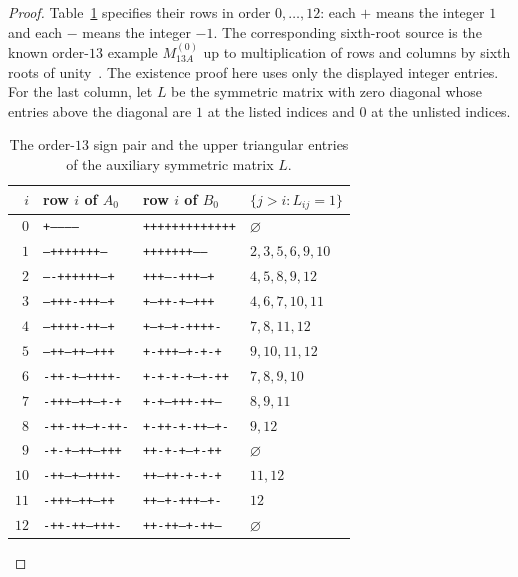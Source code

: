\documentclass[10pt]{article}
\begin{document}
\begin{proof}
Table~\ref{tab:seed13} specifies their rows in order $0,\ldots,12$:
each $+$ means the integer $1$ and each $-$ means the integer $-1$.
The corresponding sixth-root source is the known order-$13$ example
$M_{13A}^{(0)}$ up to multiplication of rows and columns by sixth roots of
unity~\cite{catalogue}. The existence proof here uses only the displayed
integer entries. For the last column, let $L$ be the symmetric matrix
with zero diagonal whose entries above the diagonal are $1$ at the
listed indices and $0$ at the unlisted indices.

\begin{table}[htbp]
\centering\small
\setlength{\tabcolsep}{5pt}
\begin{tabular}{rlll}
$i$&row $i$ of $A_0$&row $i$ of $B_0$&$\{j>i:L_{ij}=1\}$\\\hline
$0$ &\texttt{+------------}&\texttt{+++++++++++++}&$\varnothing$\\
$1$ &\texttt{---+++++++---}&\texttt{+++++++------}&$2,3,5,6,9,10$\\
$2$ &\texttt{----++++++--+}&\texttt{+++----+++--+}&$4,5,8,9,12$\\
$3$ &\texttt{---+++-+++--+}&\texttt{+---++-+--+++}&$4,6,7,10,11$\\
$4$ &\texttt{---++++-++--+}&\texttt{+--+--+-++++-}&$7,8,11,12$\\
$5$ &\texttt{--++--++--+++}&\texttt{+-+++---+-+-+}&$9,10,11,12$\\
$6$ &\texttt{-++-+---++++-}&\texttt{+-+-+-+--+-++}&$7,8,9,10$\\
$7$ &\texttt{-+++--++--+-+}&\texttt{+-+--+++-++--}&$8,9,11$\\
$8$ &\texttt{-++-++--+-++-}&\texttt{+-++-+-++--+-}&$9,12$\\
$9$ &\texttt{-+-+--++--+++}&\texttt{++-+-+---+-++}&$\varnothing$\\
$10$&\texttt{-++--+--++++-}&\texttt{++---++-+-+-+}&$11,12$\\
$11$&\texttt{-+++--++---++}&\texttt{++--+-+++--+-}&$12$\\
$12$&\texttt{-++-++---+++-}&\texttt{++-++--+-++--}&$\varnothing$\\\hline
\end{tabular}
\caption{The order-$13$ sign pair and the upper triangular entries of
the auxiliary symmetric matrix $L$.}
\label{tab:seed13}
\end{table}


\end{proof}
\end{document}
